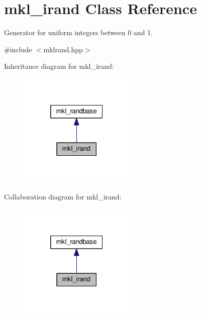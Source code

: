 \hypertarget{classmkl__irand}{}\section{mkl\+\_\+irand Class Reference}
\label{classmkl__irand}


Generator for uniform integers between 0 and 1.  




{\ttfamily \#include $<$mklrand.\+hpp$>$}



Inheritance diagram for mkl\+\_\+irand\+:
\nopagebreak
\begin{figure}[H]
\begin{center}
\leavevmode
\includegraphics[width=157pt]{d2/db8/classmkl__irand__inherit__graph}
\end{center}
\end{figure}


Collaboration diagram for mkl\+\_\+irand\+:
\nopagebreak
\begin{figure}[H]
\begin{center}
\leavevmode
\includegraphics[width=157pt]{d2/d34/classmkl__irand__coll__graph}
\end{center}
\end{figure}
